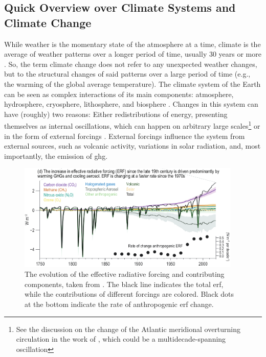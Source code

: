 \subsection{Quick Overview over Climate Systems and Climate Change}


While weather is the momentary state of the atmosphere at a time, climate is the average of weather patterns over a longer period of time, usually 30 years or more \cite{noaa_whats_nodate}. 
So, the term climate change does not refer to any unexpected weather changes, but to the structural changes of said patterns over a large period of time (e.g., the warming of the global average temperature). 
The climate system of the Earth can be seen as complex interactions of its main components: atmosphere, hydrosphere, cryosphere, lithosphere, and biosphere \cite{vietinghoffdiss, intergovernmental_panel_on_climate_change_ipcc_climate_2023}. 
Changes in this system can have (roughly) two reasons:
Either redistributions of energy, presenting themselves as internal oscillations, which can happen on arbitrary large scales\footnote{See the discussion on the change of the Atlantic meridional overturning circulation in the work of , which could be a multidecade-spanning oscillation} or in the form of external forcings \cite{vietinghoffdiss}. 
External forcings influence the system from external sources, such as volcanic activity, variations in solar radiation, and, most importantly, the emission of \ac{ghg}. 

\begin{figure}[htb]
  \begin{center}
    \includegraphics[width=0.95\textwidth]{figures/ERF_change_with_forcings.png}
  \end{center}
  \caption[IPCC 2024 ERF Influences Evolution]{The evolution of the effective radiative forcing and contributing components, taken from \cite{intergovernmental_panel_on_climate_change_ipcc_climate_2023}. The black line indicates the total \ac{erf}, while the contributions of different forcings are colored. Black dots at the bottom indicate the rate of anthropogenic \ac{erf} change.}
  \label{fig:erf-with-forcings}
\end{figure}

